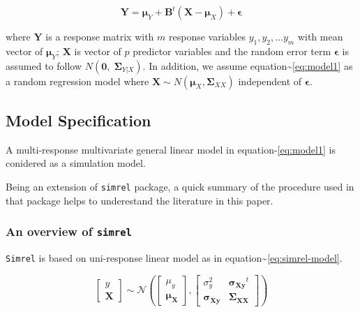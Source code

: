 \documentclass[12pt,A4paper,authoryear]{elsarticle} %
\begin{document}
\begin{equation}
  \mathbf{Y} = \boldsymbol{\mu}_Y + \mathbf{B}^t (\mathbf{X} - \boldsymbol{\mu}_X) + \boldsymbol{\epsilon}
  \label{eq:model1}
\end{equation}

where \(\mathbf{Y}\) is a response matrix with \(m\) response variables
\(y_1, y_2, \ldots y_m\) with mean vector of \(\boldsymbol{\mu}_Y\);
\(\mathbf{X}\) is vector of \(p\) predictor variables and the random
error term \(\boldsymbol{\epsilon}\) is assumed to follow
\(N(\boldsymbol{0},\; \boldsymbol{\Sigma}_{Y|X})\). In addition, we
assume equation\textasciitilde{}\eqref{eq:model1} as a random regression
model where
\(\mathbf{X} \sim N\left(\boldsymbol{\mu}_X, \boldsymbol{\Sigma}_{XX}\right)\)
independent of \(\boldsymbol{\epsilon}\).

\subsection{Model Specification}\label{model-specification}

A multi-response multivariate general linear model in
equation-\eqref{eq:model1} is conidered as a simulation model.

Being an extension of \texttt{simrel} package, a quick summary of the
procedure used in that package helps to underestand the literature in
this paper.

\subsubsection{\texorpdfstring{An overview of
\texttt{simrel}}{An overview of simrel}}\label{an-overview-of-simrel}

\texttt{Simrel} is based on uni-response linear model as in
equation\textasciitilde{}\eqref{eq:simrel-model}.

\begin{equation}
\label{eq:simrel-model}
  \begin{bmatrix}
    y \\ \mathbf{X}
  \end{bmatrix} \sim
  \mathcal{N}\left(
    \begin{bmatrix}
      \mu_y \\ \boldsymbol{\mu_X}
    \end{bmatrix},
    \begin{bmatrix}
      \sigma_y^2               & \boldsymbol{\sigma_{Xy}}^t \\
      \boldsymbol{\sigma_{Xy}} & \boldsymbol{\Sigma_{XX}}
    \end{bmatrix}
  \right)
\end{equation}
\end{document}
